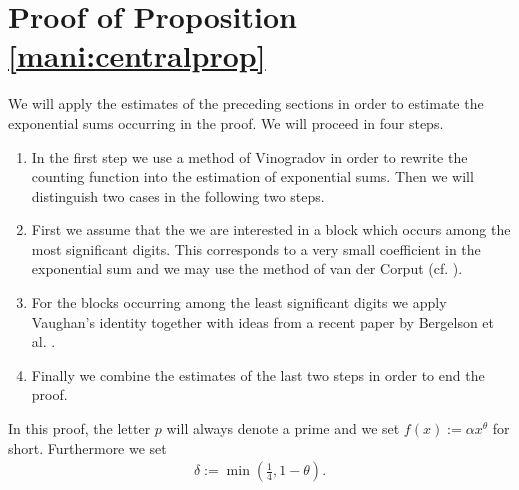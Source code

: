 \documentclass[a4paper,10pt]{amsart}
\newtheorem{prop}[lem]{Proposition}
\numberwithin{equation}{section}
\theoremstyle{definition}
\theoremstyle{remark}
\begin{document}


\section{Proof of Proposition \ref{mani:centralprop}}\label{sec:proof-prop-refm}

We will apply the estimates of the preceding sections in order to estimate the
exponential sums occurring in the proof. We will proceed in four steps.
\begin{enumerate}
\item In the first step we use a method of Vinogradov
  \cite{vinogradov2004:method_trigonometrical_sums} in order to rewrite the
  counting function into the estimation of exponential sums. Then we will
  distinguish two cases in the following two steps.
\item First we assume that the we are interested in a block which occurs among
  the most significant digits. This corresponds to a very small coefficient in
  the exponential sum and we may use the method of van der Corput
  (cf. \cite{graham_kolesnik1991:van_der_corputs}).
\item For the blocks occurring among the least significant digits we apply
  Vaughan's identity together with ideas from a recent paper by Bergelson
  et al. \cite{bergelson_kolesnik_madritsch+2012:uniform_distribution_prime}.
\item Finally we combine the estimates of the last two steps in order to end
  the proof.
\end{enumerate}

In this proof, the letter $p$ will always denote a prime and we set
$f(x):=\alpha x^\theta$ for short. Furthermore we set
\begin{gather}\label{mani:delta}
\delta:=\min\left(\frac14,1-\theta\right).
\end{gather}
\end{document}

